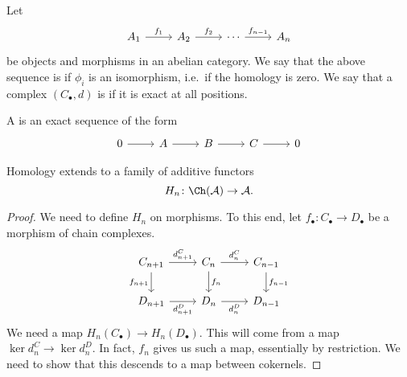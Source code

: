 \documentclass[main.tex]{subfiles}
\begin{document}
\begin{definition}
  \label{def:exact_sequence_abelian}
  Let
  \begin{equation*}
    \begin{tikzcd}
      A_{1}
      \arrow[r, "f_{1}"]
      & A_{2}
      \arrow[r, "f_{2}"]
      & \cdots
      \arrow[r, "f_{n-1}"]
      & A_{n}
    \end{tikzcd}
  \end{equation*}
  be objects and morphisms in an abelian category. We say that the above sequence is  if $\phi_{i}$ is an isomorphism, i.e.\ if the homology is zero. We say that a complex $(C_{\bullet}, d)$ is  if it is exact at all positions.

  A  is an exact sequence of the form
  \begin{equation*}
    \begin{tikzcd}
      0
      \arrow[r]
      & A
      \arrow[r]
      & B
      \arrow[r]
      & C
      \arrow[r]
      & 0
    \end{tikzcd}
  \end{equation*}
\end{definition}

\begin{proposition}
  Homology extends to a family of additive functors
  \begin{equation*}
    H_{n}\colon \Ch(\mathcal{A}) \to \mathcal{A}.
  \end{equation*}
\end{proposition}
\begin{proof}
  We need to define $H_{n}$ on morphisms. To this end, let $f_{\bullet}\colon C_{\bullet} \to D_{\bullet}$ be a morphism of chain complexes.
  \begin{equation*}
    \begin{tikzcd}
      C_{n+1}
      \arrow[r, "d^{C}_{n+1}"]
      \arrow[d, swap, "f_{n+1}"]
      & C_{n}
      \arrow[r, "d^{C}_{n}"]
      \arrow[d, "f_{n}"]
      & C_{n-1}
      \arrow[d, "f_{n-1}"]
      \\
      D_{n+1}
      \arrow[r, swap, "d^{D}_{n+1}"]
      & D_{n}
      \arrow[r, swap, "d^{D}_{n}"]
      & D_{n-1}
    \end{tikzcd}
  \end{equation*}
  We need a map $H_{n}(C_{\bullet}) \to H_{n}(D_{\bullet})$. This will come from a map $\ker d^{C}_{n} \to \ker d^{D}_{n}$. In fact, $f_{n}$ gives us such a map, essentially by restriction. We need to show that this descends to a map between cokernels.
\end{proof}
\end{document}
